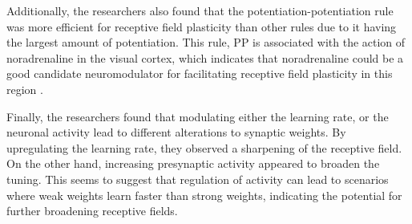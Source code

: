 Additionally, the researchers also found that the potentiation-potentiation rule was more efficient for receptive field plasticity than other rules due to it having the largest amount of potentiation. This rule, PP is associated with the action of noradrenaline in the visual cortex, which indicates that noradrenaline could be a good candidate neuromodulator for facilitating receptive field plasticity in this region \cite{pedrosaRoleNeuromodulatorsCortical2017}.

Finally, the researchers found that modulating either the learning rate, or the neuronal activity lead to different alterations to synaptic weights. By upregulating the learning rate, they observed a sharpening of the receptive field. On the other hand, increasing presynaptic activity appeared to broaden the tuning. This seems to suggest that regulation of activity can lead to scenarios where weak weights learn faster than strong weights, indicating the potential for further broadening receptive fields.



